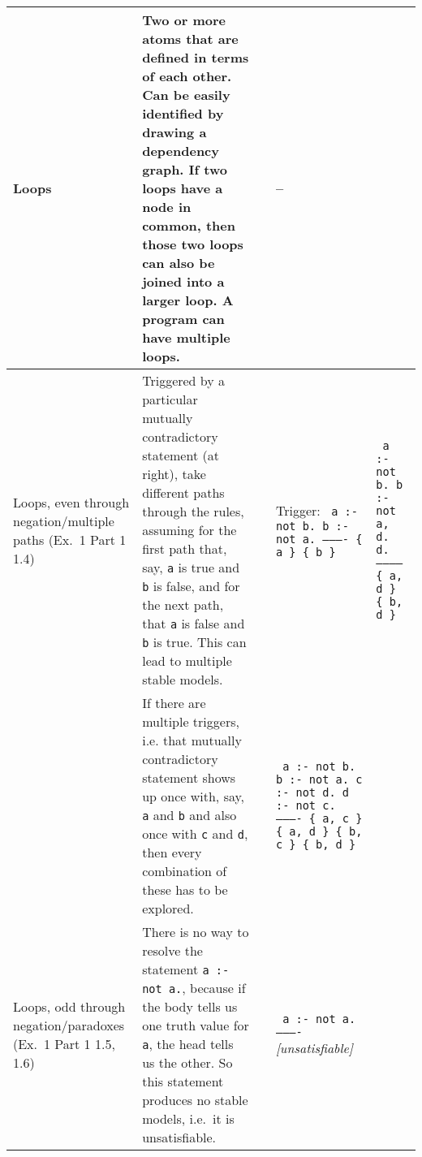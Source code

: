 \documentclass[9pt,a4paper,landscape]{article}
\begin{document}
{\begin{longtable}{Lp{14.5cm}lXX}
Loops
& Two or more atoms that are defined in terms of each other. Can be easily identified by drawing a dependency graph.
If two loops have a node in common, then those two loops can also be joined into a larger loop.
A program can have multiple loops.
&& -- &\\ \midrule

Loops, even \newline through negation\slash \newline multiple paths \newline (Ex.\ 1 Part 1  1.4)
& Triggered by a particular mutually contradictory statement (at right), take different paths through the rules, assuming for the first path that, say, \texttt{a} is true and \texttt{b} is false, and for the next path, that \texttt{a} is false and \texttt{b} is true.
This can lead to multiple stable models.

&& Trigger: \newline
\texttt{%
	a :- not b. \newline
	b :- not a. \newline
	---------- \newline
	\{ a \} \newline
	\{ b \}}
& \texttt{%
	a :- not b. \newline
	b :- not a, d. \newline
	d. \newline
	----------- \newline
	\{ a, d \} \newline
	\{ b, d \}} \newline \\ %


& If there are multiple triggers, i.e. that mutually contradictory statement shows up once with, say, \texttt{a} and \texttt{b} and also once with \texttt{c} and \texttt{d}, then every combination of these has to be explored.
&& \texttt{%
	a :- not b. \newline
	b :- not a. \newline
	c :- not d. \newline
	d :- not c. \newline
	---------- \newline
	\{ a, c \} \newline
	\{ a, d \} \newline
	\{ b, c \} \newline
	\{ b, d \}}
&\\ \midrule

Loops, odd \newline through negation\slash \newline paradoxes \newline (Ex.\ 1 Part 1  1.5, 1.6)
& There is no way to resolve the statement \texttt{a :- not a.}, because if the body tells us one truth value for \texttt{a}, the head tells us the other.
So this statement produces no stable models, i.e.\ it is unsatisfiable.		
&& \texttt{%
	a :- not a. \newline
	---------- \newline}
\textit{[unsatisfiable]}
& \\ %


\end{longtable}}
\end{document}
